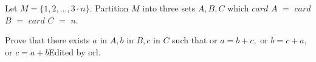 Let $M=\{1,2,\ldots,3 \cdot n\}$. Partition $M$ into three sets $A,B,C$ which $card$ $A$ $=$ $card$ $B$ $=$ $card$ $C$ $=$ $n .$

Prove that there exists $a$ in $A,b$ in $B, c$ in $C$ such that or $a=b+c,$ or $b=c+a,$ or $c=a+b$Edited by orl.